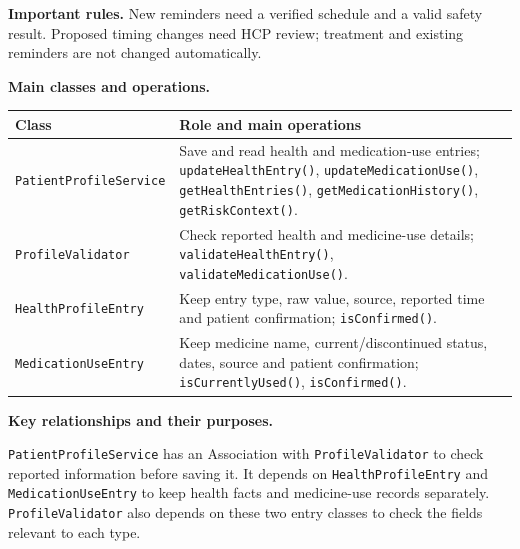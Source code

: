 \noindent\textbf{Important rules.} New reminders need a verified schedule and
a valid safety result. Proposed timing changes need HCP review; treatment
and existing reminders are not changed automatically.



\noindent\textbf{Main classes and operations.}\par\smallskip
\begingroup\small
\noindent\begin{tabularx}{\textwidth}{|L{0.37\textwidth}|Y|}
\hline
\textbf{Class} & \textbf{Role and main operations} \\ \hline
\texttt{PatientProfileService} & Save and read health and medication-use entries; \texttt{updateHealthEntry()}, \texttt{updateMedicationUse()}, \texttt{getHealthEntries()}, \texttt{getMedicationHistory()}, \texttt{getRiskContext()}. \\ \hline
\texttt{ProfileValidator} & Check reported health and medicine-use details; \texttt{validateHealthEntry()}, \texttt{validateMedicationUse()}. \\ \hline
\texttt{HealthProfileEntry} & Keep entry type, raw value, source, reported time and patient confirmation; \texttt{isConfirmed()}. \\ \hline
\texttt{MedicationUseEntry} & Keep medicine name, current/discontinued status, dates, source and patient confirmation; \texttt{isCurrentlyUsed()}, \texttt{isConfirmed()}. \\ \hline
\end{tabularx}\par
\endgroup

\noindent\textbf{Key relationships and their purposes.}\par\smallskip
\texttt{PatientProfileService} has an Association with
\texttt{ProfileValidator} to check reported information before saving it.
It depends on \texttt{HealthProfileEntry} and \texttt{MedicationUseEntry}
to keep health facts and medicine-use records separately.
\texttt{ProfileValidator} also depends on these two entry classes to
check the fields relevant to each type.

